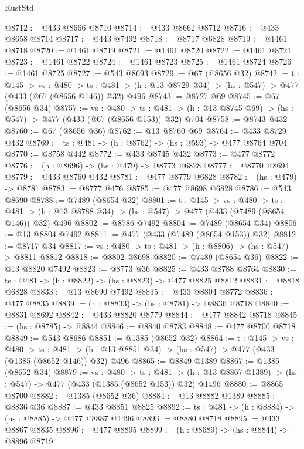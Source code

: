 \begin{lexlean}{RustStd}
\begin{coremodule}
{\begin{coremodule}
{{{{{{{{{{{{{{{{@8712 := @433 @8666 @8710
@8714 := @433 @8662 @8712
@8716 := @433 @8658 @8714
@8717 := @443 @7492
@8718 := @8717 @6828
@8719 := @1461 @8718
@8720 := @1461 @8719
@8721 := @1461 @8720
@8722 := @1461 @8721
@8723 := @1461 @8722
@8724 := @1461 @8723
@8725 := @1461 @8724
@8726 := @1461 @8725
@8727 := @543 @8693
@8729 := @67 (@8656 @32)
@8742 := {t : @145} ->
  {vs : @480} ->
  {ts : @481} -> (h : @13 @8729 @34) -> (hs : @547) -> @477 (@433 (@67 (@8656 @146)) @32) @496
@8743 := @8727 @69
@8745 := @67 (@8656 @34)
@8757 := {vs : @480} ->
  {ts : @481} -> (h : @13 @8745 @69) -> (hs : @547) -> @477 (@433 (@67 (@8656 @153)) @32) @704
@8758 := @8743 @432
@8760 := @67 (@8656 @36)
@8762 := @13 @8760 @69
@8764 := @433 @8729 @432
@8769 := {ts : @481} -> (h : @8762) -> (hs : @593) -> @477 @8764 @704
@8770 := @8758 @442
@8772 := @433 @8745 @432
@8773 := @477 @8772
@8776 := (h : @8696) -> (hs : @479) -> @8773 @6828
@8777 := @8770 @8694
@8779 := @433 @8760 @432
@8781 := @477 @8779 @6828
@8782 := (hs : @479) -> @8781
@8783 := @8777 @476
@8785 := @477 @8698 @6828
@8786 := @543 @8690
@8788 := @7489 (@8654 @32)
@8801 := {t : @145} ->
  {vs : @480} ->
  {ts : @481} -> (h : @13 @8788 @34) -> (hs : @547) -> @477 (@433 (@7489 (@8654 @146)) @32) @496
@8802 := @8786 @7492
@8804 := @7489 (@8654 @34)
@8806 := @13 @8804 @7492
@8811 := @477 (@433 (@7489 (@8654 @153)) @32)
@8812 := @8717 @34
@8817 := {vs : @480} -> {ts : @481} -> (h : @8806) -> (hs : @547) -> @8811 @8812
@8818 := @8802 @8698
@8820 := @7489 (@8654 @36)
@8822 := @13 @8820 @7492
@8823 := @8773 @36
@8825 := @433 @8788 @8764
@8830 := {ts : @481} -> (h : @8822) -> (hs : @8823) -> @477 @8825 @8812
@8831 := @8818 @6828
@8833 := @13 @8690 @7492
@8835 := @433 @8804 @8772
@8836 := @477 @8835
@8839 := (h : @8833) -> (hs : @8781) -> @8836 @8718
@8840 := @8831 @8692
@8842 := @433 @8820 @8779
@8844 := @477 @8842 @8718
@8845 := (hs : @8785) -> @8844
@8846 := @8840 @8783
@8848 := @477 @8700 @8718
@8849 := @543 @8686
@8851 := @1385 (@8652 @32)
@8864 := {t : @145} ->
  {vs : @480} ->
  {ts : @481} -> (h : @13 @8851 @34) -> (hs : @547) -> @477 (@433 (@1385 (@8652 @146)) @32) @496
@8865 := @8849 @1389
@8867 := @1385 (@8652 @34)
@8879 := {vs : @480} ->
  {ts : @481} -> (h : @13 @8867 @1389) -> (hs : @547) -> @477 (@433 (@1385 (@8652 @153)) @32) @1496
@8880 := @8865 @8700
@8882 := @1385 (@8652 @36)
@8884 := @13 @8882 @1389
@8885 := @8836 @36
@8887 := @433 @8851 @8825
@8892 := {ts : @481} -> (h : @8884) -> (hs : @8885) -> @477 @8887 @1496
@8893 := @8880 @8718
@8895 := @433 @8867 @8835
@8896 := @477 @8895
@8899 := (h : @8689) -> (hs : @8844) -> @8896 @8719
}}}}}}}}}}}}}}}}
\end{coremodule}}
\end{coremodule}
\end{lexlean}
